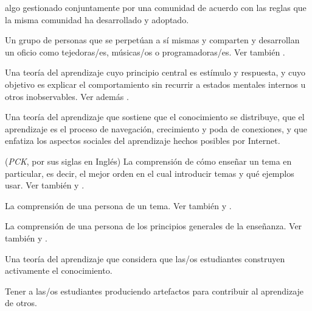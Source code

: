 \begin{description}
 algo gestionado conjuntamente por una comunidad
de acuerdo con las reglas que la misma comunidad ha desarrollado y adoptado.

 Un grupo de personas que se perpetúan a sí mismas
y comparten y desarrollan un oficio como tejedoras/es, músicas/os o programadoras/es. Ver también
.

 Una teoría del aprendizaje cuyo principio central
es estímulo y respuesta, y cuyo objetivo es explicar el comportamiento sin recurrir
a estados mentales internos u otros inobservables. Ver
además .

 Una teoría del aprendizaje que sostiene que el conocimiento se distribuye,
que el aprendizaje es el proceso de navegación, crecimiento y poda de conexiones, y que enfatiza los aspectos
sociales del aprendizaje hechos posibles por Internet.

 (\emph{PCK}, por sus siglas en Inglés) La comprensión de cómo enseñar un tema en particular, es decir, el mejor orden en el cual introducir temas y qué ejemplos usar. Ver también
y .

 La comprensión de una
persona de un tema. Ver también
y .

 La
comprensión de una persona de los principios generales de la enseñanza. Ver también
y .

 Una teoría del aprendizaje que considera que
las/os estudiantes construyen activamente el conocimiento.

 Tener a las/os estudiantes
produciendo artefactos para contribuir al aprendizaje de otros.


\end{description}
